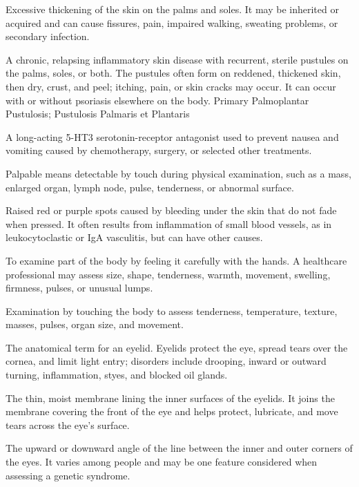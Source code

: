  Excessive thickening of the skin on the palms and soles. It may be inherited or acquired and can cause fissures, pain, impaired walking, sweating problems, or secondary infection.

 A chronic, relapsing inflammatory skin disease with recurrent, sterile pustules on the palms, soles, or both. The pustules often form on reddened, thickened skin, then dry, crust, and peel; itching, pain, or skin cracks may occur. It can occur with or without psoriasis elsewhere on the body.
\synonyms
Primary Palmoplantar Pustulosis; Pustulosis Palmaris et Plantaris

 A long-acting 5-HT3 serotonin-receptor antagonist used to prevent nausea and vomiting caused by chemotherapy, surgery, or selected other treatments.

 Palpable means detectable by touch during physical examination, such as a mass, enlarged organ, lymph node, pulse, tenderness, or abnormal surface.

 Raised red or purple spots caused by bleeding under the skin that do not fade when pressed. It often results from inflammation of small blood vessels, as in leukocytoclastic or IgA vasculitis, but can have other causes.

 To examine part of the body by feeling it carefully with the hands. A healthcare professional may assess size, shape, tenderness, warmth, movement, swelling, firmness, pulses, or unusual lumps.

 Examination by touching the body to assess tenderness, temperature, texture, masses, pulses, organ size, and movement.

 The anatomical term for an eyelid. Eyelids protect the eye, spread tears over the cornea, and limit light entry; disorders include drooping, inward or outward turning, inflammation, styes, and blocked oil glands.

 The thin, moist membrane lining the inner surfaces of the eyelids. It joins the membrane covering the front of the eye and helps protect, lubricate, and move tears across the eye’s surface.

 The upward or downward angle of the line between the inner and outer corners of the eyes. It varies among people and may be one feature considered when assessing a genetic syndrome.

